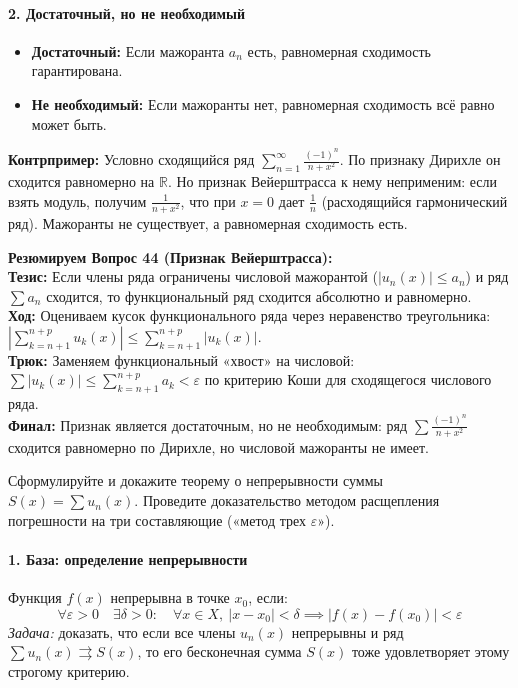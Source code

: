 \paragraph{2. Достаточный, но не необходимый}
\begin{itemize}
    \item \textbf{Достаточный:} Если мажоранта $a_n$ есть, равномерная сходимость гарантирована.
    \item \textbf{Не необходимый:} Если мажоранты нет, равномерная сходимость всё равно может быть. 
\end{itemize}
\textbf{Контрпример:} Условно сходящийся ряд $\sum_{n=1}^{\infty} \frac{(-1)^n}{n+x^2}$. По признаку Дирихле он сходится равномерно на $\mathbb{R}$. Но признак Вейерштрасса к нему неприменим: если взять модуль, получим $\frac{1}{n+x^2}$, что при $x=0$ дает $\frac{1}{n}$ (расходящийся гармонический ряд). Мажоранты не существует, а равномерная сходимость есть.

\begin{tcolorbox}[colback=gray!5, colframe=black, boxrule=0.5pt, arc=0pt]
\textbf{Резюмируем Вопрос 44 (Признак Вейерштрасса):} \\
\textbf{Тезис:} Если члены ряда ограничены числовой мажорантой ($|u_n(x)| \le a_n$) и ряд $\sum a_n$ сходится, то функциональный ряд сходится абсолютно и равномерно. \\
\textbf{Ход:} Оцениваем кусок функционального ряда через неравенство треугольника: $|\sum_{k=n+1}^{n+p} u_k(x)| \le \sum_{k=n+1}^{n+p} |u_k(x)|$. \\
\textbf{Трюк:} Заменяем функциональный «хвост» на числовой: $\sum |u_k(x)| \le \sum_{k=n+1}^{n+p} a_k < \varepsilon$ по критерию Коши для сходящегося числового ряда. \\
\textbf{Финал:} Признак является достаточным, но не необходимым: ряд $\sum \frac{(-1)^n}{n+x^2}$ сходится равномерно по Дирихле, но числовой мажоранты не имеет.
\end{tcolorbox}




{Сформулируйте и докажите теорему о непрерывности суммы $S(x) = \sum u_n(x)$. Проведите доказательство методом расщепления погрешности на три составляющие («метод трех $\varepsilon$»).}

\paragraph{1. База: определение непрерывности}
Функция $f(x)$ непрерывна в точке $x_0$, если:
$$ \forall \varepsilon > 0 \quad \exists \delta > 0 : \quad \forall x \in X, \ |x - x_0| < \delta \implies |f(x) - f(x_0)| < \varepsilon $$
\textit{Задача:} доказать, что если все члены $u_n(x)$ непрерывны и ряд $\sum u_n(x) \rightrightarrows S(x)$, то его бесконечная сумма $S(x)$ тоже удовлетворяет этому строгому критерию.


